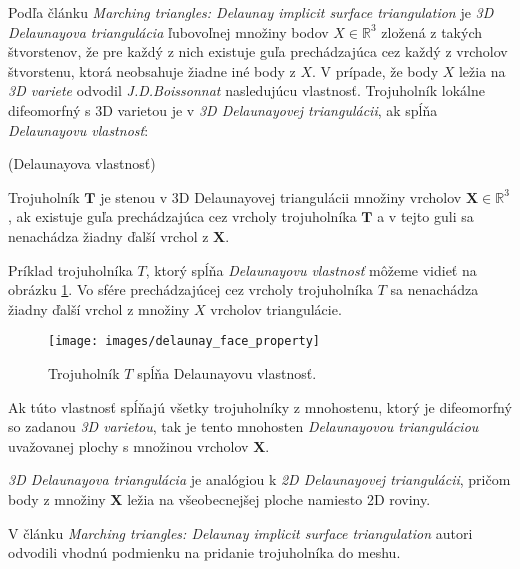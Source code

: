 Podľa článku \textit{Marching triangles: Delaunay implicit surface triangulation} \cite{hilton1997marching} 
je \textit{3D Delaunayova triangulácia} ľubovoľnej množiny bodov $X\in \mathbb{R}^3$
zložená z takých štvorstenov, že pre každý z nich existuje guľa prechádzajúca cez každý z vrcholov 
štvorstenu, ktorá neobsahuje žiadne iné body z $X$. V prípade, že body $X$ ležia na \textit{3D variete} 
odvodil \textit{J.D.Boissonnat} \cite{boissonnat1984geometric} nasledujúcu vlastnosť. Trojuholník
lokálne difeomorfný s 3D varietou je v \textit{3D Delaunayovej triangulácii}, ak spĺňa 
\textit{Delaunayovu vlastnosť}:

\begin{definition}
    (Delaunayova vlastnosť)

    Trojuholník $\mathbf{T}$ je stenou v 3D Delaunayovej triangulácii množiny vrcholov 
    $\mathbf{X}\in \mathbb{R}^3$, ak existuje guľa prechádzajúca cez vrcholy trojuholníka 
    $\mathbf{T}$ a v tejto guli sa nenachádza žiadny ďalší vrchol z $\mathbf{X}$. 
\end{definition}

Príklad trojuholníka $T$, ktorý spĺňa \textit{Delaunayovu vlastnosť} môžeme vidieť na obrázku 
\ref{obr:delaunay_face_property}. Vo sfére prechádzajúcej cez vrcholy trojuholníka $T$ 
sa nenachádza žiadny ďalší vrchol z množiny $X$ vrcholov triangulácie.

\begin{figure}
    \centerline{\texttt{[image: images/delaunay\_face\_property]}}
    \caption[Trojuholník $T$ spĺňajúci Delaunayovu vlastnosť]
    {\cite{hilton1996marching} Trojuholník $T$ spĺňa Delaunayovu vlastnosť.}
    \label{obr:delaunay_face_property}
\end{figure}

Ak túto vlastnosť spĺňajú všetky trojuholníky z mnohostenu, ktorý je difeomorfný so zadanou
\textit{3D varietou}, tak je tento mnohosten \textit{Delaunayovou trianguláciou} uvažovanej plochy
s množinou vrcholov $\mathbf{X}$.

\textit{3D Delaunayova triangulácia} je analógiou k \textit{2D Delaunayovej triangulácii}, pričom
body z množiny $\mathbf{X}$ ležia na všeobecnejšej ploche namiesto 2D roviny.

V článku \textit{Marching triangles: Delaunay implicit surface triangulation} \cite{hilton1997marching}
autori odvodili vhodnú podmienku na pridanie trojuholníka do meshu.

